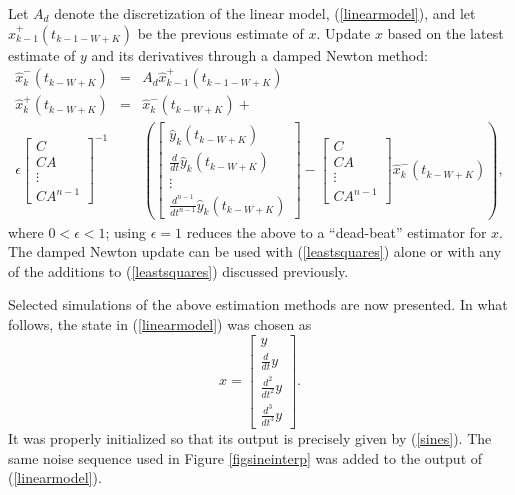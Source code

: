 Let $A_d$ denote the discretization of the linear model, (\ref{linearmodel}),
and let $\hat{x}_{k-1}^{+}(t_{k-1-W+K})$ be the previous estimate of $x$.  Update $x$
based on the latest estimate of $y$ and its derivatives through a damped Newton
method:
\begin{eqnarray}
\hat{x}_{k}^{-}(t_{k-W+K}) & = & A_d \hat{x}_{k-1}^{+}(t_{k-1-W+K}) \nonumber \\
\hat{x}_{k}^{+}(t_{k-W+K}) & = & \hat{x}_{k}^{-}(t_{k-W+K}) + \label{newton} \\
\epsilon \left[ \begin{array}{l} C \\ CA \\ \vdots \\ CA^{n-1} \end{array} 
\right]^{-1} & &  ( \left[ \begin{array}{l} 
\hat{y}_{k}(t_{k-W+K}) \\
\frac{d}{dt} \hat{y}_{k}(t_{k-W+K}) \\ 
\vdots \\ 
\frac{d^{n-1}}{dt^{n-1}} \hat{y}_{k}(t_{k-W+K}) \end{array} \right] - 
\left[ \begin{array}{l} C \\ CA \\ \vdots \\ CA^{n-1} \end{array} 
\right]  \hat{x}_{k}^{-}(t_{k-W+K}) ), \nonumber
\end{eqnarray}
where $0 < \epsilon <  1$; using $\epsilon = 1$ reduces the above to a ``dead-beat''
estimator for $x$.  The damped Newton update can be used with
(\ref{leastsquares}) alone or with any of
the additions to (\ref{leastsquares}) discussed previously.

Selected simulations of the above estimation methods are now presented.
In what follows,
the state in (\ref{linearmodel}) was chosen as 
$$ x = \left[ \begin{array}{r}
y \\ \frac{d}{dt} y \\  \frac{d^2}{dt^2} y \\ \frac{d^3}{dt^3} y 
\end{array} \right]. $$  
It was properly initialized so that its output is precisely
given by (\ref{sines}).  The same noise sequence used in
Figure \ref{figsineinterp} was added to the output of (\ref{linearmodel}).



